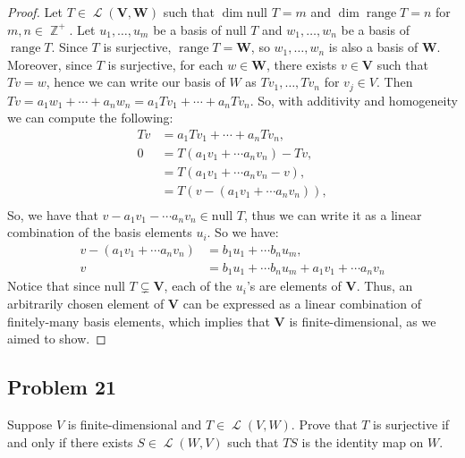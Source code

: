 \documentclass[letterpaper, 12pt]{amsart}
\DeclareMathOperator{\Z}{\mathbb{Z}}				%
\DeclareMathOperator{\Ell}{\mathscr{L}}				%
\renewcommand{\null}{\text{null }}					%
\DeclareMathOperator{\range}{\text{range }}			%
\theoremstyle{definition}  							%
\begin{document}
		\begin{proof}
		Let $T \in \Ell(\mathbf{V},\mathbf{W})$ such that $\dim \null T = m$ and $\dim \range T = n$ for $m,n \in \Z^{+}$.
		Let $u_{1}, \dots, u_{m}$ be a basis of $\null T$ and $w_{1}, \dots, w_{n}$ be a basis of $\range T$.
		Since $T$ is surjective, $\range T = \mathbf{W}$, so $w_{1}, \dots, w_{n}$ is also a basis of $\mathbf{W}$.
		Moreover, since $T$ is surjective, for each $w \in \mathbf{W}$, there exists $v \in \mathbf{V}$ such that $Tv = w$, hence we can write our basis of $W$ as $Tv_{1}, \dots, Tv_{n}$ for $v_{j} \in V$.
		Then $Tv = a_{1}w_{1} + \cdots + a_{n}w_{n} = a_{1}Tv_{1} + \cdots + a_{n}Tv_{n}$.
		So, with additivity and homogeneity we can compute the following:
			\begin{align*}
				Tv &= a_{1}Tv_{1} + \cdots + a_{n}Tv_{n}, \\
				0 &= T(a_{1}v_{1} + \cdots a_{n}v_{n}) - Tv, \\
				&= T(a_{1}v_{1} + \cdots a_{n}v_{n} - v), \\
				&= T(v - (a_{1}v_{1} + \cdots a_{n}v_{n}) ), \\
			\end{align*}
		So, we have that $v - a_{1}v_{1} - \cdots a_{n}v_{n} \in \null T$, thus we can write it as a linear combination of the basis elements $u_{i}$. 
		So we have:
		\begin{align*}
			v - (a_{1}v_{1} + \cdots a_{n}v_{n}) &= b_{1}u_{1} + \cdots b_{n}u_{m}, \\
			v &= b_{1}u_{1} + \cdots b_{n}u_{m} + a_{1}v_{1} + \cdots a_{n}v_{n}
		\end{align*}
		Notice that since $\null T \subsetneq \mathbf{V}$, each of the $u_{i}$'s are elements of $\mathbf{V}$.
		Thus, an arbitrarily chosen element of $\mathbf{V}$ can be expressed as a linear combination of finitely-many basis elements, which implies that $\mathbf{V}$ is finite-dimensional, as we aimed to show.
		\end{proof}

		\subsection*{Problem 21}
		Suppose $V$ is finite-dimensional and $T \in \Ell(V,W)$. 
		Prove that $T$ is surjective if and only if there exists $S \in \Ell(W,V)$ such that $TS$ is the identity map on $W$.
\end{document}
